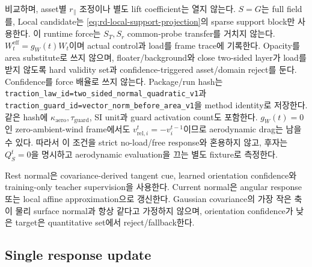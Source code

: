 \documentclass[11pt]{article}
\newcommand{\code}[1]{{\small\nolinkurl{#1}}}
\begin{document}
비교하며, asset별 \(r_{\parallel}\) 조정이나 별도 lift coefficient는 열지 않는다.
\(S=G\)는 full field를, Local candidate는 \eqref{eq:rd-local-support-projection}의 sparse support
block만 사용한다. 이 runtime force는 \(S_T,S_r\) common-probe transfer를 거치지 않는다.
\(W_t^{\mathrm{eff}}=g_W(t)W_t\)이며 actual control과 load를 frame trace에 기록한다.
Opacity를 area substitute로 쓰지 않으며, floater/background와 close two-sided layer가 load를 받지 않도록
hard validity set과 confidence-triggered asset/domain reject를 둔다. Confidence를 force 배율로 쓰지 않는다.
Package/run hash는
\code{traction_law_id=two_sided_normal_quadratic_v1}과
\code{traction_guard_id=vector_norm_before_area_v1}을 method identity로 저장한다.
같은 hash에 \(\kappa_{\mathrm{aero}},\tau_{\mathrm{guard}}\), SI unit과 guard activation count도 포함한다.
\(g_W(t)=0\)인 zero-ambient-wind frame에서도 \(v_{\mathrm{rel},i}^t=-v_i^{t-1}\)이므로 aerodynamic drag는
남을 수 있다. 따라서 이 조건을 strict no-load/free response와 혼용하지 않고, 후자는
\(Q_S^t=0\)을 명시하고 aerodynamic evaluation을 끄는 별도 fixture로 측정한다.

Rest normal은 covariance-derived tangent cue, learned orientation confidence와 training-only teacher supervision을 사용한다.
Current normal은 angular response 또는 local affine approximation으로 갱신한다.
Gaussian covariance의 가장 작은 축이 물리 surface normal과 항상 같다고 가정하지 않으며,
orientation confidence가 낮은 target은 quantitative set에서 reject/fallback한다.

\subsection{Single response update}
\end{document}
